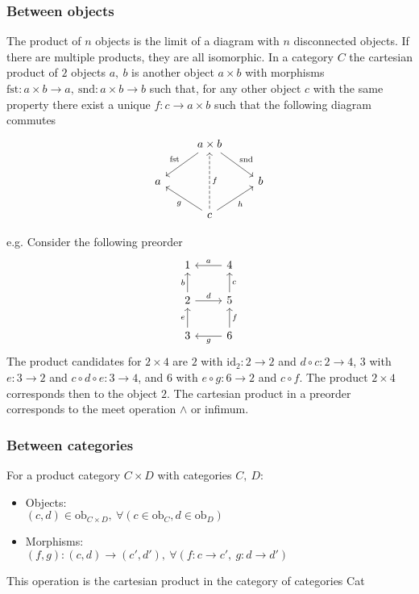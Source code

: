 \subsubsection*{Between objects}
The product of $n$ objects is the limit of a diagram with $n$ disconnected
objects. \parencite{nlab:cartesian_product} If there are multiple products, they are all isomorphic.
In a category $C$ the cartesian product of $2$ objects $a,\ b$ is another
object $a\times b$ with morphisms $\mathrm{fst}: a\times b \to a,
\ \mathrm{snd}: a\times b \to b$ such that, for any other object $c$ with the
same property there exist a unique $f:c \to a\times b$ such that the following
diagram commutes
\[\begin{tikzcd}
	& {a\times b} \\
	a && b \\
	& c
	\arrow["{\mathrm{fst}}"', from=1-2, to=2-1]
	\arrow["{\mathrm{snd}}", from=1-2, to=2-3]
	\arrow["f"', dashed, from=3-2, to=1-2]
	\arrow["g", from=3-2, to=2-1]
	\arrow["h"', from=3-2, to=2-3]
\end{tikzcd}\]

e.g.
Consider the following preorder
\[\begin{tikzcd}
	1 & 4 \\
	2 & 5 \\
	3 & 6
	\arrow["g", from=3-2, to=3-1]
	\arrow["f"', from=3-2, to=2-2]
	\arrow["c"', from=2-2, to=1-2]
	\arrow["e", from=3-1, to=2-1]
	\arrow["b", from=2-1, to=1-1]
	\arrow["a"', from=1-2, to=1-1]
	\arrow["d", from=2-1, to=2-2]
\end{tikzcd}\]
The product candidates for $2\times 4$ are $2$ with $\mathrm{id}_2 : 2\to 2$
and $d\circ c:2\to 4$, $3$ with $e: 3\to 2$ and $c\circ d\circ e: 3\to 4$,
and $6$ with $e \circ g: 6\to 2$ and $c\circ f$. The product $2\times 4$
corresponds then to the object $2$. The cartesian product in a
preorder corresponds to the meet operation $\land$ or infimum.
\parencite{fong:7sketches}

\subsubsection*{Between categories}
For a product category $C\times D$ with categories $C,\ D$:
\parencite{awodey:category_theory}
\begin{itemize}
  \item Objects:\\
    $(c, d) \in \mathrm{ob}_{C\times D},\ \forall (c \in \mathrm{ob}_C, d \in \mathrm{ob}_D)$
  \item Morphisms:\\
    $(f,g) : (c,d) \to (c', d'),\ \forall (f: c \to c',\ g:d \to d')$
\end{itemize}
This operation is the cartesian product in the category of categories Cat

